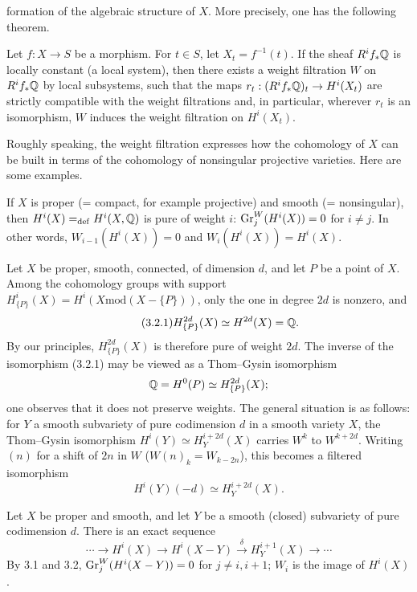 \documentclass[8pt]{extarticle}
\begin{document}
\vfill
{}
\EndSourcePage

\ReaderFont
formation of the algebraic structure of \(X\). More precisely, one has the following theorem.

 Let \(f:X\to S\) be a morphism. For \(t\in S\), let \(X_t=f^{-1}(t)\). If the sheaf \(R^if_*\mathbb{Q}\) is locally constant (a local system), then there exists a weight filtration \(W\) on \(R^if_*\mathbb{Q}\) by local subsystems, such that the maps \(r_t:(R^if_*\mathbb{Q})_t\to H^i(X_t)\) are strictly compatible with the weight filtrations and, in particular, wherever \(r_t\) is an isomorphism, \(W\) induces the weight filtration on \(H^i(X_t)\).\EndTheorem

 Roughly speaking, the weight filtration expresses how the cohomology of \(X\) can be built in terms of the cohomology of nonsingular projective varieties. Here are some examples.

 If \(X\) is proper (= compact, for example projective) and smooth (= nonsingular), then \(H^i(X)=_{\mathrm{def}}H^i(X,\mathbb{Q})\) is pure of weight \(i\): \(\operatorname{Gr}_j^W(H^i(X))=0\) for \(i\ne j\). In other words, \(W_{i-1}(H^i(X))=0\) and \(W_i(H^i(X))=H^i(X)\).

 Let \(X\) be proper, smooth, connected, of dimension \(d\), and let \(P\) be a point of \(X\). Among the cohomology groups with support \(H^i_{\{P\}}(X)=H^i(X\mathbin{\mathrm{mod}}(X-\{P\}))\), only the one in degree \(2d\) is nonzero, and
\begin{equation}\tag{3.2.1}
H^{2d}_{\{P\}}(X)\simeq H^{2d}(X)=\mathbb{Q}.
\end{equation}
By our principles, \(H^{2d}_{\{P\}}(X)\) is therefore pure of weight \(2d\). The inverse of the isomorphism (3.2.1) may be viewed as a Thom--Gysin isomorphism
\[
\mathbb{Q}=H^0(P)\simeq H^{2d}_{\{P\}}(X);
\]
one observes that it does not preserve weights. The general situation is as follows: for \(Y\) a smooth subvariety of pure codimension \(d\) in a smooth variety \(X\), the Thom--Gysin isomorphism \(H^i(Y)\simeq H_Y^{i+2d}(X)\) carries \(W^k\) to \(W^{k+2d}\). Writing \((n)\) for a shift of \(2n\) in \(W\) (\(W(n)_k=W_{k-2n}\)), this becomes a filtered isomorphism
\[
H^i(Y)(-d)\simeq H_Y^{i+2d}(X).
\]

 Let \(X\) be proper and smooth, and let \(Y\) be a smooth (closed) subvariety of pure codimension \(d\). There is an exact sequence
\[
\cdots\to H^i(X)\to H^i(X-Y)\xrightarrow{\delta}H_Y^{i+1}(X)\to\cdots
\]
By 3.1 and 3.2, \(\operatorname{Gr}_j^W(H^i(X-Y))=0\) for \(j\ne i,i+1\); \(W_i\) is the image of \(H^i(X)\).
\end{document}
